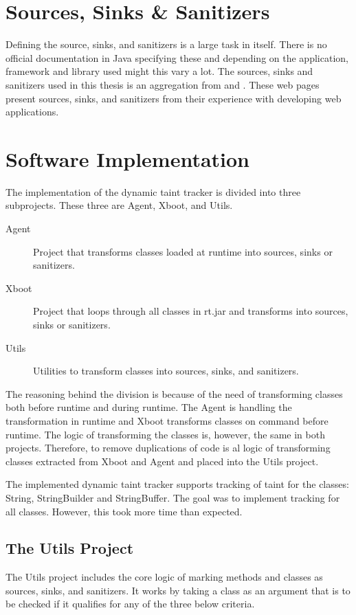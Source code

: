 \section{Sources, Sinks \& Sanitizers}
Defining the source, sinks, and sanitizers is a large task in itself. There is no official documentation in Java specifying these and depending on the application, framework and library used might this vary a lot.  The sources, sinks and sanitizers used in this thesis is an aggregation from \textcite{sssCodeMaster} and \textcite{sssOWASP}. These web pages present sources, sinks, and sanitizers from their experience with developing web applications. 



\section{Software Implementation}
\label{SoftwareArchitecture}
The implementation of the dynamic taint tracker is divided into three subprojects. These three are Agent, Xboot, and Utils. 

\hfill
\begin{description}
    \item[Agent] Project that transforms classes loaded at runtime into sources, sinks or sanitizers.
    \item[Xboot] Project that loops through all classes in rt.jar and transforms into sources, sinks or sanitizers.
    \item[Utils] Utilities to transform classes into sources, sinks, and sanitizers. 
\end{description}
\hfill

The reasoning behind the division is because of the need of transforming classes both before runtime and during runtime. The Agent is handling the transformation in runtime and Xboot transforms classes on command before runtime. The logic of transforming the classes is, however, the same in both projects. Therefore, to remove duplications of code is al logic of transforming classes extracted from Xboot and Agent and placed into the Utils project.

The implemented dynamic taint tracker supports tracking of taint for the classes: String, StringBuilder and StringBuffer. The goal was to implement tracking for all classes. However, this took more time than expected.



\subsection{The Utils Project}
The Utils project includes the core logic of marking methods and classes as sources, sinks, and sanitizers. It works by taking a class as an argument that is to be checked if it qualifies for any of the three below criteria.

